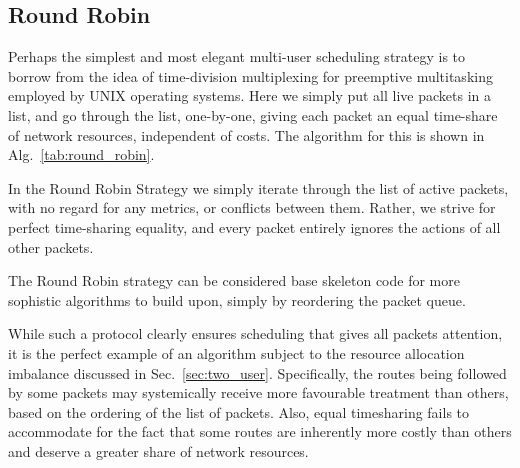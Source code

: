 \documentclass[aps,rmp,twocolumn,amsmath,amssymb,nofootinbib,superscriptaddress]{revtex4}
\begin{document}
\subsection{Round Robin} \label{sec:round_robin}

Perhaps the simplest and most elegant multi-user scheduling strategy is to borrow from the idea of time-division multiplexing for preemptive multitasking employed by UNIX operating systems. Here we simply put all live packets in a list, and go through the list, one-by-one, giving each packet an equal time-share of network resources, independent of costs. The algorithm for this is shown in Alg.~\ref{tab:round_robin}.

\begin{table}[!htb]
\caption{In the {\sc Round Robin Strategy} we simply iterate through the list of active packets, with no regard for any metrics, or conflicts between them. Rather, we strive for perfect time-sharing equality, and every packet entirely ignores the actions of all other packets.} \label{tab:round_robin}
\end{table}
The {\sc Round Robin} strategy can be considered base skeleton code for more sophistic algorithms to build upon, simply by reordering the packet queue.

While such a protocol clearly ensures scheduling that gives all packets attention, it is the perfect example of an algorithm subject to the resource allocation imbalance discussed in Sec.~\ref{sec:two_user}. Specifically, the routes being followed by some packets may systemically receive more favourable treatment than others, based on the ordering of the list of packets. Also, equal timesharing fails to accommodate for the fact that some routes are inherently more costly than others and deserve a greater share of network resources.
\end{document}
